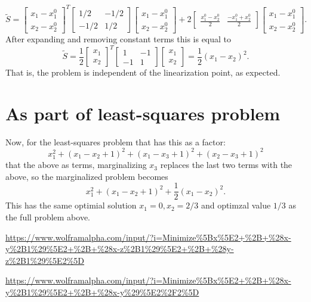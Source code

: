 $$
 \tilde S = \begin{bmatrix}
   x_1 - x_1^0 \\
   x_2 - x_2^0
 \end{bmatrix}^T
 \begin{bmatrix}
  1/2 & -1/2 \\ -1/2 & 1/2
\end{bmatrix}
\begin{bmatrix}
  x_1 - x_1^0 \\
  x_2 - x_2^0
\end{bmatrix}
+ 2 \begin{bmatrix}
  \frac{x_1^0 - x_2^0}{2} & \frac{-x_1^0 + x_2^0}{2}
\end{bmatrix} \begin{bmatrix}
  x_1 - x_1^0 \\
  x_2 - x_2^0
\end{bmatrix}.
$$
After expanding and removing constant terms this is equal to
$$
  \tilde S = \frac{1}{2} \begin{bmatrix}
    x_1 \\ x_2
  \end{bmatrix}^T \begin{bmatrix}
    1 & -1 \\ -1 & 1
  \end{bmatrix}
  \begin{bmatrix}
    x_1 \\ x_2
  \end{bmatrix} = \frac{1}{2} (x_1 - x_2)^2.
$$
That is, the problem is independent of the linearization point, as expected.

\section{As part of least-squares problem}

Now, for the least-squares problem that has this as a factor:
$$
  x_1^2 + (x_1-x_2+1)^2 + (x_1-x_3+1)^2 + (x_2-x_3+1)^2
$$
that the above as terms, marginalizing $x_3$ replaces the last two terms with the above, so the marginalized problem becomes
$$
  x_1^2 + (x_1-x_2+1)^2 + \frac{1}{2} (x_1-x_2)^2.
$$
This has the same optimial solution $x_1=0, x_2=2/3$ and optimzal value $1/3$ as the full problem above.

\url{https://www.wolframalpha.com/input/?i=Minimize%5Bx%5E2+%2B+%28x-y%2B1%29%5E2+%2B+%28x-z%2B1%29%5E2+%2B+%28y-z%2B1%29%5E2%5D}

\url{https://www.wolframalpha.com/input/?i=Minimize%5Bx%5E2+%2B+%28x-y%2B1%29%5E2+%2B+%28x-y%29%5E2%2F2%5D}